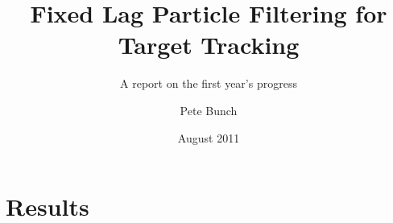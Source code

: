\documentclass{RJWThesis}
\title{Fixed Lag Particle Filtering for Target Tracking}
\subtitle{A report on the first year's progress}
\author{Pete Bunch}
\date{August 2011}
\begin{document}
\chapter{Results}

\end{document}
